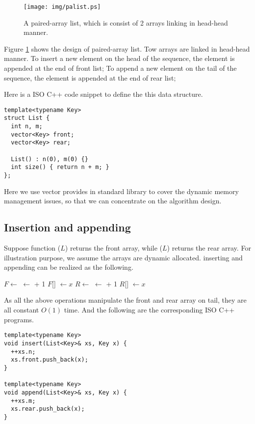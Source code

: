 \documentclass[UTF8]{article}
\begin{document}
\begin{figure}[htbp]
  \centering
  \texttt{[image: img/palist.ps]}
  \caption{A paired-array list, which is consist of 2 arrays linking in head-head manner.} \label{fig:palist}
\end{figure}

Figure \ref{fig:palist} shows the design of paired-array list. Tow arrays are linked in head-head manner.
To insert a new element on the head of the sequence, the element is appended at the end of front list;
To append a new element on the tail of the sequence, the element is appended at the end of rear list;

Here is a ISO C++ code snippet to define the this data structure.

\lstset{language=C++}
\begin{lstlisting}
template<typename Key>
struct List {
  int n, m;
  vector<Key> front;
  vector<Key> rear;

  List() : n(0), m(0) {}
  int size() { return n + m; }
};
\end{lstlisting}

Here we use vector provides in standard library to cover the dynamic memory management issues, so
that we can concentrate on the algorithm design.

\subsection{Insertion and appending}
Suppose function ($L$) returns the front array, while ($L$) returns the
rear array. For illustration purpose, we assume the arrays are dynamic allocated. inserting and appending
can be realized as the following.

\begin{algorithmic}
  \State $F \gets $ 
  \State {} $\gets $  + 1
  \State $F$[] $\gets x$
\EndFunction
\Statex
{}
  \State $R \gets $ 
  \State {} $\gets $  + 1
  \State $R$[] $\gets x$
\EndFunction
\end{algorithmic}

As all the above operations manipulate the front and rear array on tail, they are all constant $O(1)$ time. And the following are the corresponding ISO C++ programs.

\begin{lstlisting}
template<typename Key>
void insert(List<Key>& xs, Key x) {
  ++xs.n;
  xs.front.push_back(x);
}

template<typename Key>
void append(List<Key>& xs, Key x) {
  ++xs.m;
  xs.rear.push_back(x);
}
\end{lstlisting}
\end{document}
